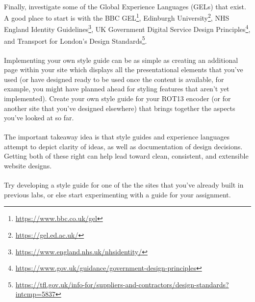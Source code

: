 \documentclass[10pt, a4paper, twosize]{article}
\begin{document}
\paragraph{} Finally, investigate some of the Global Experience Languages (GELs) that exist. A good place to start is with the BBC GEL\footnote{\url{https://www.bbc.co.uk/gel}}, Edinburgh University\footnote{\url{https://gel.ed.ac.uk/}}, NHS England Identity Guidelines\footnote{\url{https://www.england.nhs.uk/nhsidentity/}}, UK Government Digital Service Design Principles\footnote{\url{https://www.gov.uk/guidance/government-design-principles}}, and Transport for London's Design Standards\footnote{\url{https://tfl.gov.uk/info-for/suppliers-and-contractors/design-standards?intcmp=5837}}. \paragraph{} Implementing your own style guide can be as simple as creating an additional page within your site which displays all the presentational elements that you've used (or have designed ready to be used once the content is available, for example, you might have planned ahead for styling features that aren't yet implemented). Create your own style guide for your ROT13 encoder (or for another site that you've designed elsewhere) that brings together the aspects you've looked at so far.

\paragraph{} The important takeaway idea is that style guides and experience languages attempt to depict clarity of ideas, as well as documentation of design decisions. Getting both of these right can help lead toward clean, consistent, and extensible website designs.

\paragraph{} Try developing a style guide for one of the the sites that you've already built in previous labs, or else start experimenting with a guide for your assignment.
\end{document}
